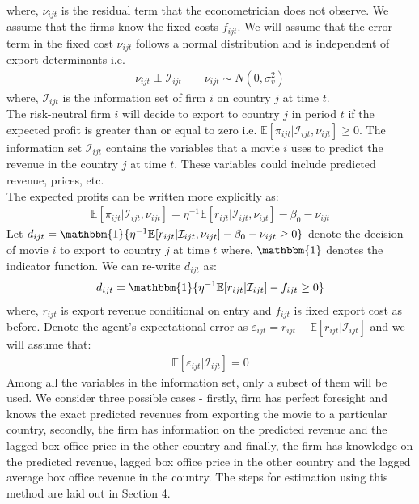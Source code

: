 \documentclass[11pt, letterpaper]{article} \usepackage{amsmath}
\begin{document}
where, $\nu_{ijt}$ is the residual term that the econometrician does
not observe. We assume that the firms know the fixed costs $f_{ijt}$.
We will assume that the error term in the fixed cost $\nu_{ijt}$
follows a normal distribution and is independent of export
determinants i.e.
\begin{align*}
  \nu_{ijt} \perp \mathcal{I}_{ijt} \qquad \nu_{ijt} \sim N(0, \sigma_v^2)
\end{align*}
where, $\mathcal{I}_{ijt}$ is the information set of firm $i$ on
country $j$ at time $t$.\\
The risk-neutral firm $i$ will decide to export to country $j$ in
period $t$ if the expected profit is greater than or equal to zero
i.e. $\mathbb{E}[\pi_{ijt} | \mathcal{I}_{ijt}, \nu_{ijt}] \geq 0$.
The information set $\mathcal{I}_{ijt}$ contains the variables that a
movie $i$ uses to predict the revenue in the country $j$ at time
$t$. These variables could include predicted revenue, prices, etc.\\
The expected profits can be written more explicitly as:
\begin{align*}
  \mathbb{E}[\pi_{ijt}|\mathcal{I}_{ijt}, \nu_{ijt}] = \eta^{-1}
  \mathbb{E}[r_{ijt} | \mathcal{I}_{ijt}, \nu_{ijt}] - \beta_0 - \nu_{ijt}
\end{align*}
Let
$d_{ijt} = \mathbbm{1}\{\eta^{-1}\mathbb{E}[r_{ijt} |
\mathcal{I}_{ijt}, \nu_{ijt}] - \beta_0 - \nu_{ijt} \geq 0\}$
denote the decision of movie $i$ to export to country $j$ at time $t$
where, $\mathbbm{1}$ denotes the indicator function. We can re-write
$d_{ijt}$ as:
\begin{align*}
  d_{ijt} = \mathbbm{1}\{\eta^{-1} \mathbb{E}[r_{ijt} |
  \mathcal{I}_{ijt}] - f_{ijt} \geq 0\}
\end{align*}
where, $r_{ijt}$ is export revenue conditional on entry and $f_{ijt}$
is fixed export cost as before. Denote the agent's expectational error
as
$\varepsilon_{ijt} = r_{ijt} - \mathbb{E}[r_{ijt} |
\mathcal{I}_{ijt}]$ and we will assume that:
\begin{align*}
  \mathbb{E}[\varepsilon_{ijt} | \mathcal{I}_{ijt}] = 0
\end{align*}
Among all the variables in the information set, only a subset of them
will be used. We consider three possible cases - firstly, firm has
perfect foresight and knows the exact predicted revenues from
exporting the movie to a particular country, secondly, the firm has
information on the predicted revenue and the lagged box office price
in the other country and finally, the firm has knowledge on the
predicted revenue, lagged box office price in the other country and
the lagged average box office revenue in the country. The steps for
estimation using this method are laid out in Section 4.
\end{document}
